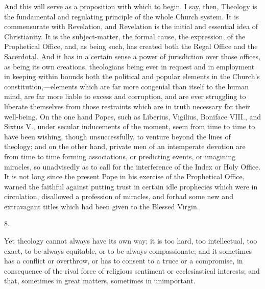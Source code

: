 And this will serve as a proposition with which to begin. I say,
then, Theology is the fundamental and regulating principle of the
whole Church system. It is commensurate with Revelation, and
Revelation is the initial and essential idea of Christianity. It is
the subject-matter, the formal cause, the expression, of the
Prophetical Office, and, as being such, has created both the Regal
Office and the Sacerdotal. And it has in a certain sense a power of
jurisdiction over those offices, as being its own creations, theologians being ever in request and in employment in keeping within
bounds both the political and popular elements in the Church's
constitution,—elements which are far more congenial than itself to
the human mind, are far more liable to excess and corruption, and are
ever struggling to liberate themselves from those restraints which are
in truth necessary for their well-being. On the one hand Popes, such
as Liberius, Vigilius, Boniface VIII., and Sixtus V., under secular
inducements of the moment, seem from time to time to have been
wishing, though unsuccessfully, to venture beyond the lines of
theology; and on the other hand, private men of an intemperate
devotion are from time to time forming associations, or predicting
events, or imagining miracles, so unadvisedly as to call for the
interference of the Index or Holy Office. It is not long since the
present Pope in his exercise of the Prophetical Office, warned the
faithful against putting trust in certain idle prophecies which were
in circulation, disallowed a profession of miracles, and forbad some
new and extravagant titles which had been given to the Blessed Virgin.

8.

Yet theology cannot always have its own way; it is too hard, too
intellectual, too exact, to be always equitable, or to be always
compassionate; and it sometimes has a conflict or overthrow, or
has to consent to a truce or a compromise, in consequence of the rival
force of religious sentiment or ecclesiastical interests; and that,
sometimes in great matters, sometimes in unimportant.

